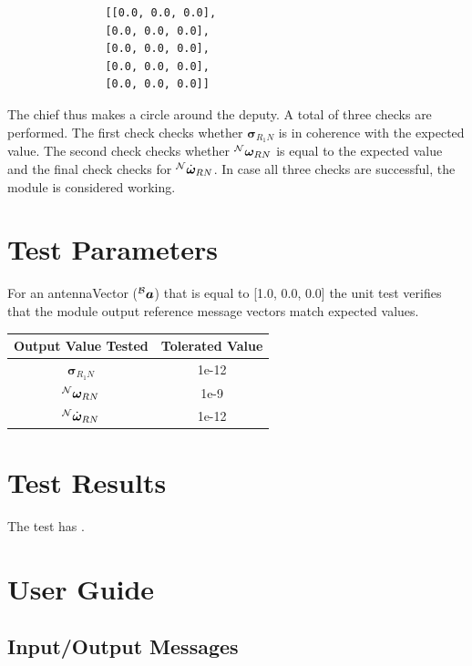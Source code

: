 \documentclass[]{AVSreport}
\begin{document}
\begin{lstlisting}
               [[0.0, 0.0, 0.0],
               [0.0, 0.0, 0.0],
               [0.0, 0.0, 0.0],
               [0.0, 0.0, 0.0],
               [0.0, 0.0, 0.0]]
\end{lstlisting}

The chief thus makes a circle around the deputy. A total of three checks are performed. The first check checks whether ${\bm \sigma}_{R_{1}N}$ is in coherence with the expected value. The second check checks whether $^{\cal N}{\bm \omega}_{RN}$ is equal to the expected value and the final check checks for $^{\cal N}\dot{\bm \omega}_{RN}$. In case all three checks are successful, the module is considered working.

\section{Test Parameters}

For an antennaVector ($^{\cal B}{\bm a}$) that is equal to [1.0, 0.0, 0.0] the unit test verifies that the module output reference message vectors match expected values.

\begin{table}[ht]
\centering
\begin{tabular}{cc}
\hline
\hline
\textbf{Output Value Tested}     & \textbf{Tolerated Value} \\ \hline
${\bm \sigma}_{R_{1}N}$          & 1e-12                    \\
$^{\cal N}{\bm \omega}_{RN}$     & 1e-9                    \\
$^{\cal N}\dot{\bm \omega}_{RN}$ & 1e-12                    \\ \hline
\hline
\end{tabular}
\end{table}

\section{Test Results}

The test has .

\section{User Guide}

\subsection{Input/Output Messages}
\end{document}
